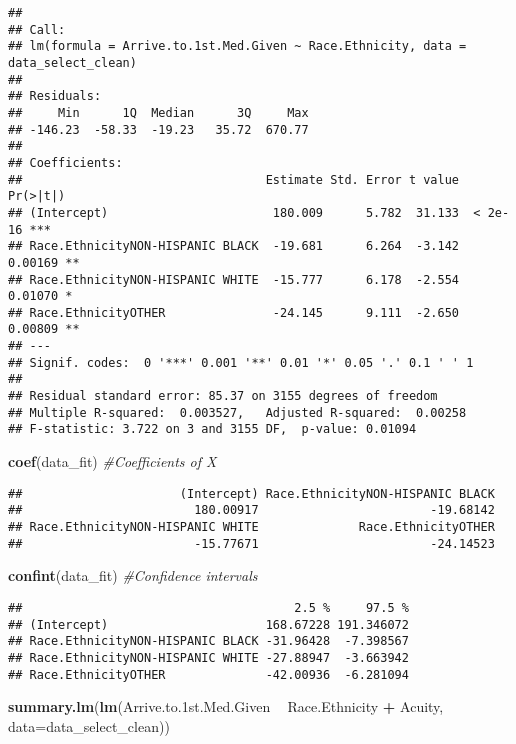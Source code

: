 \documentclass[]{article}
\newenvironment{Shaded}{\begin{snugshade}}{\end{snugshade}}
\newcommand{\KeywordTok}[1]{\textcolor[rgb]{0.13,0.29,0.53}{\textbf{#1}}}
\newcommand{\DataTypeTok}[1]{\textcolor[rgb]{0.13,0.29,0.53}{#1}}
\newcommand{\StringTok}[1]{\textcolor[rgb]{0.31,0.60,0.02}{#1}}
\newcommand{\CommentTok}[1]{\textcolor[rgb]{0.56,0.35,0.01}{\textit{#1}}}
\newcommand{\OperatorTok}[1]{\textcolor[rgb]{0.81,0.36,0.00}{\textbf{#1}}}
\newcommand{\NormalTok}[1]{#1}
\begin{document}
\begin{verbatim}
## 
## Call:
## lm(formula = Arrive.to.1st.Med.Given ~ Race.Ethnicity, data = data_select_clean)
## 
## Residuals:
##     Min      1Q  Median      3Q     Max 
## -146.23  -58.33  -19.23   35.72  670.77 
## 
## Coefficients:
##                                  Estimate Std. Error t value Pr(>|t|)    
## (Intercept)                       180.009      5.782  31.133  < 2e-16 ***
## Race.EthnicityNON-HISPANIC BLACK  -19.681      6.264  -3.142  0.00169 ** 
## Race.EthnicityNON-HISPANIC WHITE  -15.777      6.178  -2.554  0.01070 *  
## Race.EthnicityOTHER               -24.145      9.111  -2.650  0.00809 ** 
## ---
## Signif. codes:  0 '***' 0.001 '**' 0.01 '*' 0.05 '.' 0.1 ' ' 1
## 
## Residual standard error: 85.37 on 3155 degrees of freedom
## Multiple R-squared:  0.003527,   Adjusted R-squared:  0.00258 
## F-statistic: 3.722 on 3 and 3155 DF,  p-value: 0.01094
\end{verbatim}

\begin{Shaded}
\begin{Highlighting}[]
\KeywordTok{coef}\NormalTok{(data_fit) }\CommentTok{#Coefficients of X}
\end{Highlighting}
\end{Shaded}

\begin{verbatim}
##                      (Intercept) Race.EthnicityNON-HISPANIC BLACK 
##                        180.00917                        -19.68142 
## Race.EthnicityNON-HISPANIC WHITE              Race.EthnicityOTHER 
##                        -15.77671                        -24.14523
\end{verbatim}

\begin{Shaded}
\begin{Highlighting}[]
\KeywordTok{confint}\NormalTok{(data_fit) }\CommentTok{#Confidence intervals}
\end{Highlighting}
\end{Shaded}

\begin{verbatim}
##                                      2.5 %     97.5 %
## (Intercept)                      168.67228 191.346072
## Race.EthnicityNON-HISPANIC BLACK -31.96428  -7.398567
## Race.EthnicityNON-HISPANIC WHITE -27.88947  -3.663942
## Race.EthnicityOTHER              -42.00936  -6.281094
\end{verbatim}

\begin{Shaded}
\begin{Highlighting}[]
\KeywordTok{summary.lm}\NormalTok{(}\KeywordTok{lm}\NormalTok{(Arrive.to.1st.Med.Given }\OperatorTok{~}\StringTok{ }\NormalTok{Race.Ethnicity }\OperatorTok{+}\StringTok{ }\NormalTok{Acuity, }\DataTypeTok{data=}\NormalTok{data_select_clean))}
\end{Highlighting}
\end{Shaded}
\end{document}
